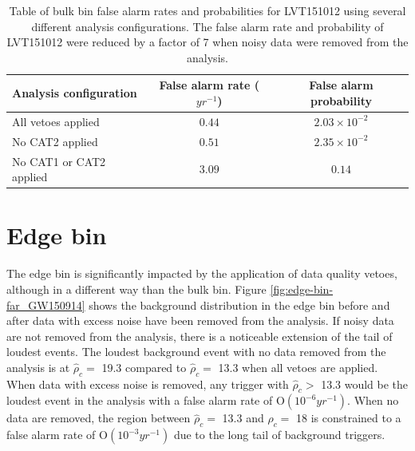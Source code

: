 \begin{table}[!ht]%
  \begin{center}
    \begin{tabular}{lcc}
      \hline
      Analysis configuration & False alarm rate ($yr^{-1}$) & False alarm probability \\ \hline
      All vetoes applied & $0.44$ & $2.03\times10^{-2}$ \\
      No CAT2 applied & $0.51$ & $2.35\times10^{-2}$ \\
      No CAT1 or CAT2 applied & $3.09$ & $0.14$ \\
      \hline
    \end{tabular}
  \end{center}
  \caption[LVT150914 FAR]{Table of bulk bin false alarm rates and probabilities for LVT151012 using several %
           different analysis %
           configurations. The false alarm rate and probability of LVT151012 were reduced by a %
           factor of 7 when noisy data were removed from the analysis.}
  \label{table:151012-far}
\end{table}

\section{Edge bin}\label{sec:edge-bin}

The edge bin is significantly impacted by the application of data quality vetoes, although in a
different way than the bulk bin. Figure \ref{fig:edge-bin-far_GW150914} shows the background
distribution in the edge bin before and after data with excess noise have been removed from the analysis.
If noisy data are not removed from the analysis, there is
a noticeable extension of the tail of loudest events. The loudest background event with no data
removed from the analysis is at $\hat{\rho}_{c} =$ 19.3 compared to $\hat{\rho}_{c} =$ 13.3
when all vetoes are applied.
When data with excess noise is removed, any trigger with $\hat{\rho}_{c} >$ 13.3 would be the loudest event in
the analysis
with a false alarm rate of O$(10^{-6} yr^{-1})$. When no data are removed, the region between
$\hat{\rho}_{c} =$ 13.3 and
$\hat{\rho}_{c} =$ 18 is constrained to a false alarm rate of O$(10^{-3} yr^{-1})$ due to the long
tail of background triggers.

